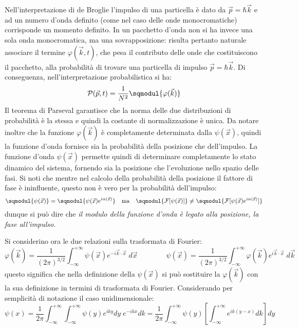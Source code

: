 Nell'interpretazione di de Broglie l'impulso di una particella \`{e} dato da $\vec{p}=\hbar\vec{k}$ e ad un numero
d'onda definito (come nel caso delle onde monocromatiche) corrisponde un momento definito. In un pacchetto d'onda non
si ha invece una sola onda monocromatica, ma una sovrapposizione: risulta pertanto naturale associare  il termine
$\varphi(\vec{k},t)$, che pesa il contributo delle onde che costituiscono il pacchetto, alla probabilit\`{a} di
trovare una particella di impulso $\vec{p}=\hbar\vec{k}$. Di conseguenza, nell'interpretazione probabilistica si ha:
\[
\mathcal{P}(\vec{p},t) = \frac{1}{N^2} \sqmodul{\varphi(\vec{k})}
\]
Il teorema di Parseval garantisce che la norma delle due distribuzioni di probabilit\`{a} \`{e} la stessa e quindi la
costante di normalizzazione \`{e} unica. Da notare inoltre che la funzione $\varphi(\vec{k})$ \`{e} completamente
determinata dalla $\psi(\vec{x})$, quindi la funzione d'onda fornisce sia la probabilit\`{a} della posizione che
dell'impulso. La funzione d'onda $\psi(\vec{x})$ permette quindi di determinare completamente lo stato dinamico del
sistema, fornendo sia la posizione che l'evoluzione nello spazio delle fasi. Si noti che mentre nel calcolo della
probabilit\`{a} della posizione il fattore di fase \`{e} ininfluente, questo non \`{e} vero per la probabilit\`{a}
dell'impulso:
\[
\sqmodul{\psi(\vec{x})} = \sqmodul{\psi(\vec{x})e^{i\alpha(\vec{x})}} \quad\text{ma}\quad
\sqmodul{\mathcal{F}[\psi(\vec{x})]} \neq \sqmodul{\mathcal{F}[\psi(\vec{x})e^{i\alpha(\vec{x})}]}
\]
dunque si pu\`{o} dire che \emph{il modulo della funzione d'onda \`{e} legato alla posizione, la fase all'impulso}.

Si considerino ora le due relazioni sulla trasformata di Fourier:
\[
\varphi(\vec{k}) = \frac{1}{(2\pi)^{3/2}} \int_{-\infty}^{+\infty} \psi(\vec{x})e^{-i\vec{k}\cdot\vec{x}}\;d\vec{x}
\qquad\qquad \psi(\vec{x}) = \frac{1}{(2\pi)^{3/2}} \int_{-\infty}^{+\infty}
\varphi(\vec{k})e^{i\vec{k}\cdot\vec{x}}\;d\vec{k}
\]
questo significa che nella definizione della $\psi(\vec{x})$ si pu\`{o} sostituire la $\varphi(\vec{k})$ con la sua
definizione in termini di trasformata di Fourier. Considerando per semplicit\`{a} di notazione il caso unidimensionale:
\[
\psi(x) = \frac{1}{2\pi} \int_{-\infty}^{+\infty} \int_{-\infty}^{+\infty} \psi(y)e^{iky} dy\; e^{-ikx} dk = \frac{1}{2\pi}
\int_{-\infty}^{+\infty} \psi(y)\left[\int_{-\infty}^{+\infty} e^{ik(y-x)} dk\right] dy
\]